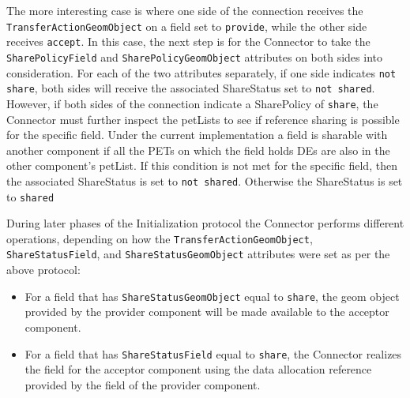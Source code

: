 The more interesting case is where one side of the connection receives the {\tt TransferActionGeomObject} on a field set to {\tt provide}, while the other side receives {\tt accept}. In this case, the next step is for the Connector to take the {\tt SharePolicyField} and {\tt SharePolicyGeomObject} attributes on both sides into consideration. For each of the two attributes separately, if one side indicates {\tt not share}, both sides will receive the associated ShareStatus set to {\tt not shared}. However, if both sides of the connection indicate a SharePolicy of {\tt share}, the Connector must further inspect the petLists to see if reference sharing is possible for the specific field. Under the current implementation a field is sharable with another component if all the PETs on which the field holds DEs are also in the other component's petList. If this condition is not met for the specific field, then the associated ShareStatus is set to {\tt not shared}. Otherwise the ShareStatus is set to {\tt shared}

During later phases of the Initialization protocol the Connector performs different operations, depending on how the {\tt TransferActionGeomObject}, {\tt ShareStatusField}, and {\tt ShareStatusGeomObject} attributes were set as per the above protocol:
\begin{itemize}
\item For a field that has {\tt ShareStatusGeomObject} equal to {\tt share}, the geom object provided by the provider component will be made available to the acceptor component.
\item For a field that has {\tt ShareStatusField} equal to {\tt share}, the Connector realizes the field for the acceptor component using the data allocation reference provided by the field of the provider component.
\end{itemize}

